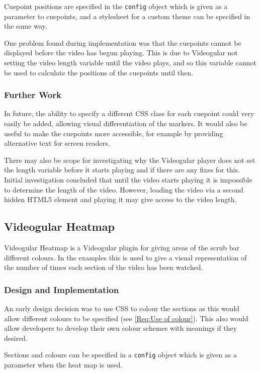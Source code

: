Cuepoint positions are specified in the \texttt{config} object which is given as a parameter to cuepoints, and a stylesheet for a custom theme can be specified in the same way.

One problem found during implementation was that the cuepoints cannot be displayed before the video has begun playing. This is due to \gls{Videogular} not setting the video length variable until the video plays, and so this variable cannot be used to calculate the positions of the cuepoints until then.

\subsubsection{Further Work}
In future, the ability to specify a different \gls{CSS} class for each cuepoint could very easily be added, allowing visual differentiation of the markers. It would also be useful to make the cuepoints more accessible, for example by providing alternative text for screen readers.

There may also be scope for investigating why the \gls{Videogular} player does not set the length variable before it starts playing and if there are any fixes for this. Initial investigation concluded that until the video starts playing it is impossible to determine the length of the video. However, loading the video via a second hidden \gls{HTML5} element and playing it may give access to the video length.

\subsection{Videogular Heatmap}
\gls{Videogular} Heatmap is a \gls{Videogular} plugin for giving areas of the scrub bar different colours. In the examples this is used to give a visual representation of the number of times each section of the video has been watched.

\subsubsection{Design and Implementation}
An early design decision was to use \gls{CSS} to colour the sections as this would allow different colours to be specified (see \cref{Req:Use of colour}). This also would allow developers to develop their own colour schemes with meanings if they desired.

Sections and colours can be specified in a \texttt{config} object which is given as a parameter when the heat map is used.

